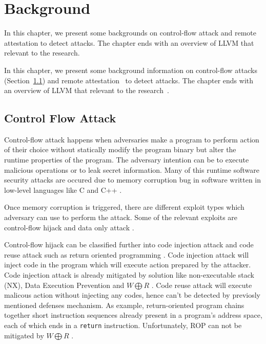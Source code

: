 
\chapter{Background} %

\label{Chapter3} %

In this chapter, we present some backgrounds on control-flow attack and remote 
attestation to detect attacks. The chapter ends with an overview of LLVM that 
relevant to the research. 

In this chapter, we present some background information on control-flow 
attacks (Section~\ref{sec:control-flow-attack}) and remote 
attestation~ to detect attacks. The chapter ends with an overview of 
LLVM that relevant to the research~. 

\section{Control Flow Attack}
\label{sec:control-flow-attack}

Control-flow attack happens when adversaries make a program to perform action of their choice without statically modify the program binary but alter the runtime properties of the program. The adversary intention can be to execute malicious operations or to leak secret information. Many of this runtime software security attacks are occured due to memory corruption bug in software written in low-level languages like C and C++ \cite{szekeresSoKEternalWar2013}.

Once memory corruption is triggered, there are different exploit types which adversary can use to perform the attack. Some of the relevant exploits are control-flow hijack \cite{shachamGeometryInnocentFlesh2007, schusterCounterfeitObjectorientedProgramming2015}  and data only attack \cite{chenNonControlDataAttacksAre2005, carliniControlFlowBendingEffectiveness2015}. 

Control-flow hijack can be classified further into code injection attack and code reuse attack such as return oriented programming \cite{roemerReturnorientedProgrammingSystems2012}.  Code injection attack will inject code in the program which will execute action prepared by the attacker. Code injection attack is already mitigated by solution like non-executable stack (NX), Data Execution Prevention and \( W \bigoplus R \) \cite{vanderveenMemoryErrorsPresent2012}. Code reuse attack will execute malicous action without injecting any codes, hence can't be detected by previosly mentioned defenses mechanism. As example, return-oriented program chains together short instruction sequences already present in a program’s address space, each of which ends in a \texttt{return} instruction. Unfortunately, ROP can not be mitigated by \( W \bigoplus R \) \cite{roemerReturnorientedProgrammingSystems2012}.

